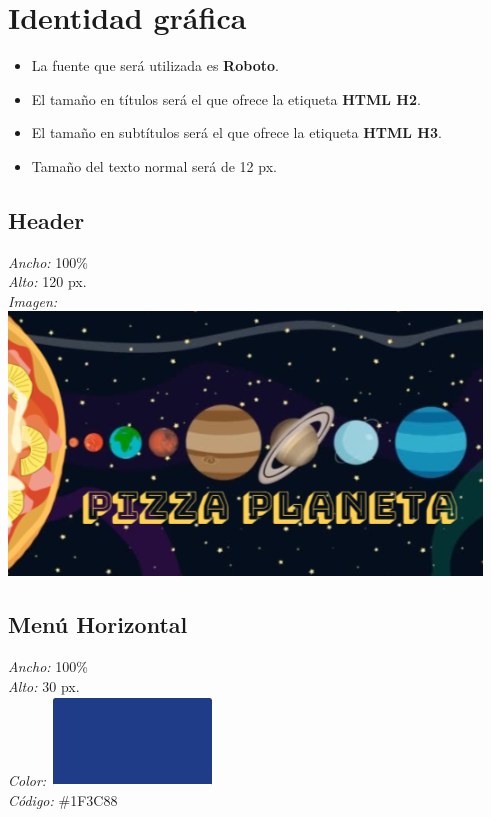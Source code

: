 
\section{Identidad gráfica}

\begin{itemize}
	\item La fuente que será utilizada es \textbf{Roboto}.
	\item El tamaño en títulos será el que ofrece la etiqueta \textbf{HTML H2}.
	\item El tamaño en subtítulos será el que ofrece la etiqueta \textbf{HTML H3}.
	\item Tamaño del texto normal será de 12 px.
\end{itemize}

\subsection{Header}

\noindent \textit{Ancho:} 100\%\\
\textit{Alto:} 120 px.\\
\textit{Imagen:} \includegraphics[scale=0.500]{imagenes/iconografia/Header.png}\\

\subsection{Menú Horizontal}

\noindent \textit{Ancho:} 100\%\\
\textit{Alto:} 30 px.\\
\textit{Color:} \includegraphics[scale=1]{imagenes/iconografia/ColorMenu.png}\\
\textit{Código:} \#1F3C88\\


